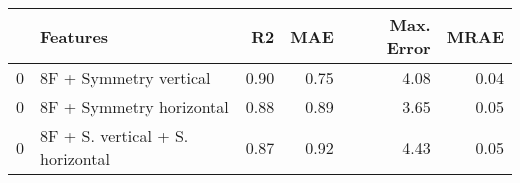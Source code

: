 \begin{tabular}{llrrrr}
\toprule
{} &                          Features &   R2 &  MAE &  Max. Error &  MRAE \\
\midrule
0 &            8F + Symmetry vertical & 0.90 & 0.75 &        4.08 &  0.04 \\
0 &          8F + Symmetry horizontal & 0.88 & 0.89 &        3.65 &  0.05 \\
0 &  8F + S. vertical + S. horizontal & 0.87 & 0.92 &        4.43 &  0.05 \\
\bottomrule
\end{tabular}
